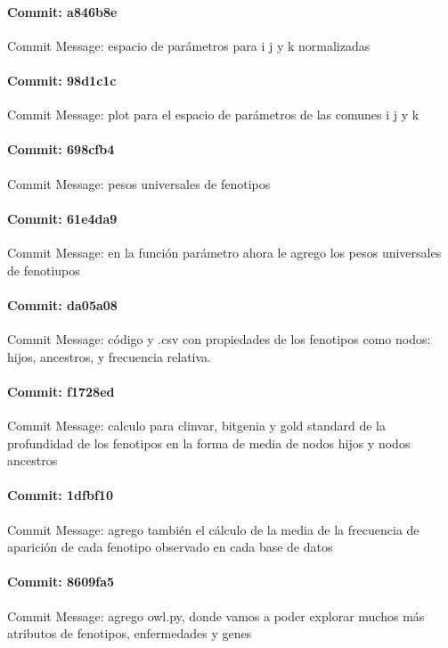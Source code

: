 \documentclass{article}
\begin{document}
\paragraph{Commit: a846b8e}
Commit Message: espacio de parámetros para i j y k normalizadas

\paragraph{Commit: 98d1c1c}
Commit Message: plot para el espacio de parámetros de las comunes i j y k

\paragraph{Commit: 698cfb4}
Commit Message: pesos universales de fenotipos

\paragraph{Commit: 61e4da9}
Commit Message: en la función parámetro ahora le agrego los pesos universales de fenotiupos

\paragraph{Commit: da05a08}
Commit Message: código y .csv con propiedades de los fenotipos como nodos: hijos, ancestros, y frecuencia relativa.

\paragraph{Commit: f1728ed}
Commit Message: calculo para clinvar, bitgenia y gold standard de la profundidad de los fenotipos en la forma de media de nodos hijos y nodos ancestros

\paragraph{Commit: 1dfbf10}
Commit Message: agrego también el cálculo de la media de la frecuencia de aparición de cada fenotipo observado en cada base de datos

\paragraph{Commit: 8609fa5}
Commit Message: agrego owl.py, donde vamos a poder explorar muchos más atributos de fenotipos, enfermedades y genes
\end{document}
